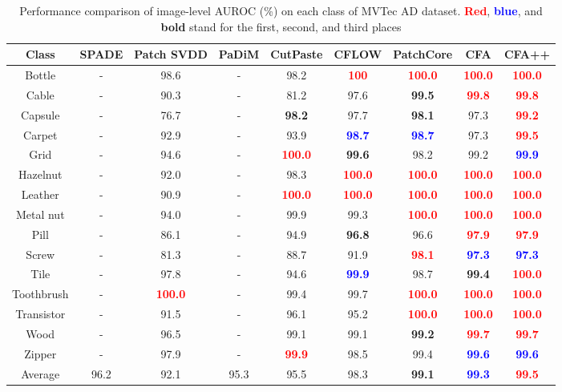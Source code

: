 \documentclass[10pt,twocolumn,letterpaper]{article}
\newcommand{\red}[1]{\textcolor{red}{\textbf{#1}}}
\newcommand{\blue}[1]{\textcolor{blue}{\textbf{#1}}}
\begin{document}
         \begin{table*}[t!]
\caption{Performance comparison of image-level AUROC (\%) on each class of MVTec AD dataset. \red{Red}, \blue{blue}, and \textbf{bold} stand for the first, second, and third places  }
\begin{center}\small
\begin{tabular}{c | c c c c c c | c c}
    \toprule
    Class     & SPADE & Patch SVDD & PaDiM & CutPaste & CFLOW & PatchCore & CFA & CFA++\\
    \midrule
    Bottle    & -     &   98.6 &  -  & 98.2 &  \red{100}   & \red{100.0} & \red{100.0} & \red{100.0} \\
    \midrule
    Cable     & -     &   90.3 &  -  & 81.2 & 97.6 &\textbf{99.5} &  \red{99.8} &  \red{99.8} \\
    \midrule
    Capsule   & -     &   76.7 &  -  & \textbf{98.2} & 97.7 & \textbf{98.1} &  97.3 &  \red{99.2} \\
    \midrule
    Carpet    & -     &   92.9 &  -  & 93.9 & \blue{98.7} &\blue{98.7} &  97.3 &  \red{99.5} \\
    \midrule
    Grid      & -     &   94.6 &  -  & \red{100.0} & \textbf{99.6} & 98.2 &  99.2 &  \blue{99.9} \\
    \midrule
    Hazelnut  & -     &   92.0 &  -  & 98.3 & \red{100.0} & \red{100.0} &  \red{100.0} &  \red{100.0} \\
    \midrule
    Leather   & -     &   90.9 &  -  & \red{100.0} & \red{100.0} &\red{100.0} &  \red{100.0} &  \red{100.0} \\
    \midrule
    Metal nut & -     &   94.0 &  -  & 99.9 & 99.3 & \red{100.0} & \red{100.0} & \red{100.0} \\
    \midrule
    Pill      & -     &   86.1 &  -  & 94.9 & \textbf{96.8} & 96.6 &  \red{97.9} &  \red{97.9} \\
    \midrule
    Screw     & -     &   81.3 &  -  & 88.7 & 91.9 & \red{98.1} &  \blue{97.3} &  \blue{97.3} \\
    \midrule
    Tile      & -     &   97.8 &  -  & 94.6 & \blue{99.9} & 98.7 &  \textbf{99.4} & \red{100.0} \\
    \midrule
    Toothbrush& -     &  \red{100.0} &  -  & 99.4 & 99.7 & \red{100.0} & \red{100.0} & \red{100.0} \\
    \midrule
    Transistor& -     &   91.5 &  -  & 96.1 & 95.2 & \red{100.0} & \red{100.0} & \red{100.0} \\
    \midrule
    Wood      & -     &   96.5 &  -  & 99.1 & 99.1 & \textbf{99.2} &  \red{99.7} &  \red{99.7} \\
    \midrule
    Zipper    & -     &   97.9 &  -  & \red{99.9} & 98.5 &  99.4 &  \blue{99.6} &  \blue{99.6} \\
    \midrule
    \midrule
    Average   &   96.2 &  92.1 &  95.3 &  95.5 &  98.3 &  \textbf{99.1} &  \blue{99.3} & \red{99.5}\\
    \bottomrule
\end{tabular}
\end{center}
\label{table:details}\vspace{-0.15cm}
\end{table*}
\end{document}
